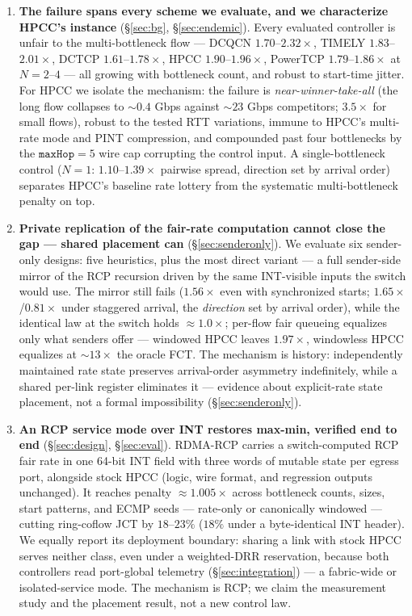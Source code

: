 \documentclass[conference]{IEEEtran}
\newcommand{\hpccfs}{\textsc{RDMA-RCP}\xspace}
\begin{document}
\begin{enumerate}
\item \textbf{The failure spans every scheme we evaluate, and we characterize HPCC's instance}
(\S\ref{sec:bg}, \S\ref{sec:endemic}). Every evaluated controller is unfair to the
multi-bottleneck flow --- DCQCN $1.70$--$2.32\times$, TIMELY $1.83$--$2.01\times$, DCTCP
$1.61$--$1.78\times$, HPCC $1.90$--$1.96\times$, PowerTCP $1.79$--$1.86\times$ at
$N = 2$--$4$ --- all growing with bottleneck count, and robust to start-time jitter. For HPCC we isolate the mechanism: the failure is
\emph{near-winner-take-all} (the long flow collapses to ${\sim}0.4$ Gbps against ${\sim}23$ Gbps
competitors; $3.5\times$ for small flows), robust to the tested RTT variations, immune to
HPCC's multi-rate mode
and PINT compression, and compounded past four bottlenecks by the $\texttt{maxHop}=5$ wire
cap corrupting the control input. A single-bottleneck
control ($N{=}1$: $1.10$--$1.39\times$ pairwise spread, direction set by arrival order)
separates HPCC's baseline rate lottery from the systematic multi-bottleneck penalty on top.

\item \textbf{Private replication of the fair-rate computation cannot close the gap ---
shared placement can} (\S\ref{sec:senderonly}). We evaluate six sender-only designs: five
heuristics, plus the most direct variant --- a full sender-side mirror of the RCP recursion
driven by the same INT-visible inputs the switch would use. The mirror still fails
($1.56\times$ even with synchronized starts; $1.65\times$/$0.81\times$ under staggered
arrival, the \emph{direction} set by arrival order), while the identical law at the switch
holds ${\approx}1.0\times$; per-flow fair queueing equalizes only what senders offer ---
windowed HPCC leaves $1.97\times$, windowless HPCC equalizes at ${\sim}13\times$ the oracle
FCT. The mechanism is history: independently maintained rate state preserves
arrival-order asymmetry indefinitely, while a shared per-link register eliminates it ---
evidence about explicit-rate state placement, not a formal impossibility
(\S\ref{sec:senderonly}).

\item \textbf{An RCP service mode over INT restores max-min, verified end to end}
(\S\ref{sec:design}, \S\ref{sec:eval}). \hpccfs carries a switch-computed RCP fair rate in one
64-bit INT field with three words of mutable state per egress port, alongside stock
HPCC (logic, wire format, and regression outputs unchanged). It reaches penalty ${\approx}1.005\times$ across bottleneck counts,
sizes, start patterns, and ECMP seeds --- rate-only or canonically windowed --- cutting
ring-coflow JCT by $18$--$23\%$ ($18\%$ under a byte-identical INT header). We equally report its deployment boundary: sharing a link with stock HPCC serves neither
class, even under a weighted-DRR reservation, because both controllers read port-global
telemetry (\S\ref{sec:integration}) --- a fabric-wide or isolated-service mode. The mechanism
is RCP; we claim the measurement study and the placement result, not a new control law.
\end{enumerate}
\end{document}
